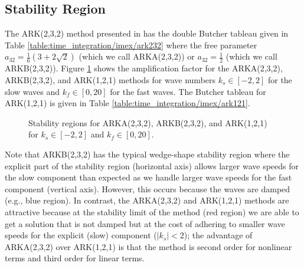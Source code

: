 \documentclass{report}
\numberwithin{equation}{section}
\begin{document}
\subsection{Stability Region}
The ARK(2,3,2) method presented in \citep{giraldo:2013} has the double Butcher tableau given in Table \ref{table:time_integration/imex/ark232} where the free parameter $a_{32}=\frac{1}{6} \left( 3 + 2 \sqrt{2} \right)$ (which we call ARKA(2,3,2)) or $a_{32}=\frac{1}{2}$ (which we call ARKB(2,3,2)).
Figure \ref{fig:time_integration/imex_stability} shows the amplification factor for the ARKA(2,3,2), ARKB(2,3,2), and ARK(1,2,1) methods for wave numbers $k_s \in [-2,2]$ for the slow waves and $k_f \in [0,20]$ for the fast waves. The Butcher tableau for ARK(1,2,1) is given in Table \ref{table:time_integration/imex/ark121}. 
\begin{figure}[htbp]
\begin{center}
\end{center}
\caption{Stability regions for ARKA(2,3,2), ARKB(2,3,2), and ARK(1,2,1) for $k_s \in [-2,2]$ and $k_f \in [0,20]$.}
\label{fig:time_integration/imex_stability}
\end{figure}
Note that ARKB(2,3,2) has the typical wedge-shape stability region where the explicit part of the stability region (horizontal axis) allows larger wave speeds for the slow component than expected as we handle larger wave speeds for the fast component (vertical axis).  However, this occurs because the waves are damped (e.g., blue region). In contrast, the ARKA(2,3,2) and ARK(1,2,1) methods are attractive because at the stability limit of the method (red region) we are able to get a solution that is not damped but at the cost of adhering to smaller wave speeds for the explicit (slow) component ($\lvert k_s \lvert < 2$); the advantage of ARKA(2,3,2) over ARK(1,2,1) is that the method is second order for nonlinear terms and third order for linear terms.
\end{document}
